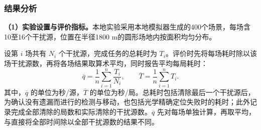 \Needspace{60mm}
\subsubsection{结果分析}\label{sec:q3-4}


\textbf{（1）实验设置与评价指标。}本地实验采用本地模拟器生成的400个场景，每场含10至16个干扰源，位置在半径1800 m的圆形场地内按面积均匀分布。

设第 $i$ 场共有 $N_i$ 个干扰源，完成任务的总耗时为 $T_i$。评价时先将每场耗时除以该场干扰源数，再将各场结果取算术平均，同时报告平均每局耗时：
\begin{equation}\label{eq:q3-17}
\overline q=\frac1n\sum_{i=1}^{n}\frac{T_i}{N_i},
\qquad
\overline T=\frac1n\sum_{i=1}^{n}T_i.
\end{equation}
其中，$\overline q$ 的单位为秒/源，$\overline T$ 的单位为秒/局。总耗时包括清除最后一个干扰源后，为确认没有遗漏而进行的检测与移动，也包括光学精确定位失败时的耗时；此外记录完成全部清除的局数和实际清除的干扰源数。$\overline q$ 先对每场单独计算，再取平均，与直接将全部时间除以全部干扰源数的结果不同。

